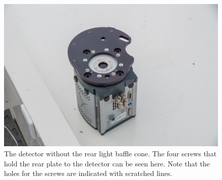 \begin{figure}
\begin{center}
\includegraphics[width=0.8\linewidth]{figures/huitzi-f8-without-rear-cone.jpg}
\end{center}
\caption{The detector without the rear light baffle cone. The four screws that hold the rear plate to the detector can be seen here. Note that the holes for the screws are indicated with scratched lines.}
\label{figure:huitzi-f8-without-rear-cone}
\end{figure}

